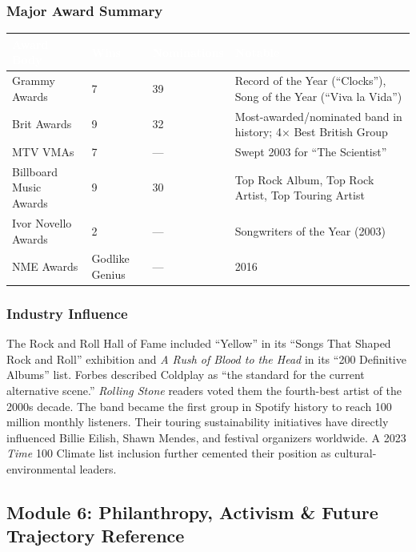 \documentclass[11pt,letterpaper]{article}
\newcommand{\tableheader}[1]{\textbf{\sffamily\textcolor{white}{#1}}}
\begin{document}
\subsubsection{Major Award Summary}

\begin{center}
\begin{tabularx}{\textwidth}{L{4cm}C{2cm}C{2cm}X}
\toprule
{}
\tableheader{Award Body} & \tableheader{Wins} & \tableheader{Nominations} & \tableheader{Notable} \\
\midrule
Grammy Awards & 7 & 39 & Record of the Year (``Clocks''), Song of the Year (``Viva la Vida'') \\
Brit Awards & 9 & 32 & Most-awarded/nominated band in history; 4× Best British Group \\
MTV VMAs & 7 & --- & Swept 2003 for ``The Scientist'' \\
Billboard Music Awards & 9 & 30 & Top Rock Album, Top Rock Artist, Top Touring Artist \\
Ivor Novello Awards & 2 & --- & Songwriters of the Year (2003) \\
NME Awards & Godlike Genius & --- & 2016 \\
\bottomrule
\end{tabularx}
\end{center}

\subsubsection{Industry Influence}

The Rock and Roll Hall of Fame included ``Yellow'' in its ``Songs That Shaped Rock and Roll'' exhibition and \textit{A Rush of Blood to the Head} in its ``200 Definitive Albums'' list. Forbes described Coldplay as ``the standard for the current alternative scene.'' \textit{Rolling Stone} readers voted them the fourth-best artist of the 2000s decade. The band became the first group in Spotify history to reach 100 million monthly listeners. Their touring sustainability initiatives have directly influenced Billie Eilish, Shawn Mendes, and festival organizers worldwide. A 2023 \textit{Time} 100 Climate list inclusion further cemented their position as cultural-environmental leaders.

\subsection{Module 6: Philanthropy, Activism \& Future Trajectory Reference}
\end{document}
